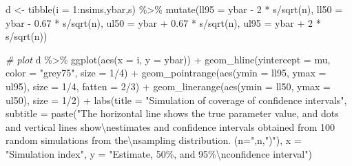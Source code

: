 \documentclass[
]{article}
\newenvironment{Shaded}{\begin{snugshade}}{\end{snugshade}}
\newcommand{\AttributeTok}[1]{\textcolor[rgb]{0.77,0.63,0.00}{#1}}
\newcommand{\CommentTok}[1]{\textcolor[rgb]{0.56,0.35,0.01}{\textit{#1}}}
\newcommand{\DecValTok}[1]{\textcolor[rgb]{0.00,0.00,0.81}{#1}}
\newcommand{\FloatTok}[1]{\textcolor[rgb]{0.00,0.00,0.81}{#1}}
\newcommand{\FunctionTok}[1]{\textcolor[rgb]{0.00,0.00,0.00}{#1}}
\newcommand{\NormalTok}[1]{#1}
\newcommand{\OtherTok}[1]{\textcolor[rgb]{0.56,0.35,0.01}{#1}}
\newcommand{\SpecialCharTok}[1]{\textcolor[rgb]{0.00,0.00,0.00}{#1}}
\newcommand{\StringTok}[1]{\textcolor[rgb]{0.31,0.60,0.02}{#1}}
\begin{document}
\begin{Shaded}
\begin{Highlighting}[]
\NormalTok{d }\OtherTok{\textless{}{-}}
  \FunctionTok{tibble}\NormalTok{(}\AttributeTok{i =} \DecValTok{1}\SpecialCharTok{:}\NormalTok{nsims,ybar,s) }\SpecialCharTok{\%\textgreater{}\%} 
  \FunctionTok{mutate}\NormalTok{(}\AttributeTok{ll95 =}\NormalTok{ ybar }\SpecialCharTok{{-}} \DecValTok{2} \SpecialCharTok{*}\NormalTok{ s}\SpecialCharTok{/}\FunctionTok{sqrt}\NormalTok{(n),}
         \AttributeTok{ll50 =}\NormalTok{ ybar }\SpecialCharTok{{-}} \FloatTok{0.67} \SpecialCharTok{*}\NormalTok{ s}\SpecialCharTok{/}\FunctionTok{sqrt}\NormalTok{(n),}
         \AttributeTok{ul50 =}\NormalTok{ ybar }\SpecialCharTok{+} \FloatTok{0.67} \SpecialCharTok{*}\NormalTok{ s}\SpecialCharTok{/}\FunctionTok{sqrt}\NormalTok{(n),}
         \AttributeTok{ul95 =}\NormalTok{ ybar }\SpecialCharTok{+} \DecValTok{2} \SpecialCharTok{*}\NormalTok{ s}\SpecialCharTok{/}\FunctionTok{sqrt}\NormalTok{(n)) }

\CommentTok{\# plot}
\NormalTok{d }\SpecialCharTok{\%\textgreater{}\%} 
  \FunctionTok{ggplot}\NormalTok{(}\FunctionTok{aes}\NormalTok{(}\AttributeTok{x =}\NormalTok{ i, }\AttributeTok{y =}\NormalTok{ ybar)) }\SpecialCharTok{+}
  \FunctionTok{geom\_hline}\NormalTok{(}\AttributeTok{yintercept =}\NormalTok{ mu, }\AttributeTok{color =} \StringTok{"grey75"}\NormalTok{, }\AttributeTok{size =} \DecValTok{1}\SpecialCharTok{/}\DecValTok{4}\NormalTok{) }\SpecialCharTok{+}
  \FunctionTok{geom\_pointrange}\NormalTok{(}\FunctionTok{aes}\NormalTok{(}\AttributeTok{ymin =}\NormalTok{ ll95, }\AttributeTok{ymax =}\NormalTok{ ul95),}
                  \AttributeTok{size =} \DecValTok{1}\SpecialCharTok{/}\DecValTok{4}\NormalTok{, }\AttributeTok{fatten =} \DecValTok{2}\SpecialCharTok{/}\DecValTok{3}\NormalTok{) }\SpecialCharTok{+}
  \FunctionTok{geom\_linerange}\NormalTok{(}\FunctionTok{aes}\NormalTok{(}\AttributeTok{ymin =}\NormalTok{ ll50, }\AttributeTok{ymax =}\NormalTok{ ul50),}
                 \AttributeTok{size =} \DecValTok{1}\SpecialCharTok{/}\DecValTok{2}\NormalTok{) }\SpecialCharTok{+}
  \FunctionTok{labs}\NormalTok{(}\AttributeTok{title =} \StringTok{"Simulation of coverage of confidence intervals"}\NormalTok{,}
       \AttributeTok{subtitle =} \FunctionTok{paste}\NormalTok{(}\StringTok{"The horizontal line shows the true parameter value, and dots and vertical lines show}\SpecialCharTok{\textbackslash{}n}\StringTok{estimates and confidence intervals obtained from 100 random simulations from the}\SpecialCharTok{\textbackslash{}n}\StringTok{sampling distribution. (n="}\NormalTok{,n,}\StringTok{")"}\NormalTok{),}
       \AttributeTok{x =} \StringTok{"Simulation index"}\NormalTok{,}
       \AttributeTok{y =} \StringTok{"Estimate, 50\%, and 95\%}\SpecialCharTok{\textbackslash{}n}\StringTok{confidence interval"}\NormalTok{)}
\end{Highlighting}
\end{Shaded}
\end{document}
